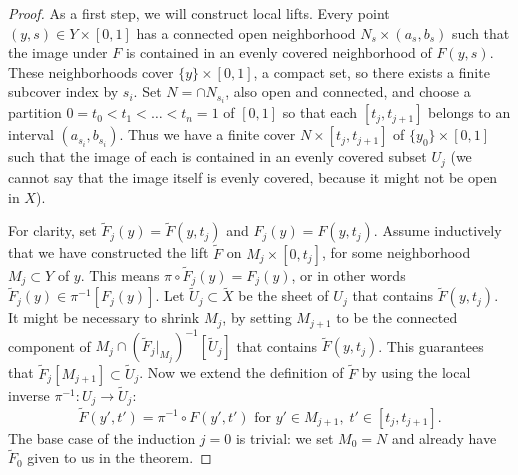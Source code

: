 \begin{proof}
As a first step, we will construct local lifts.
Every point $(y,s) \in Y \times [0,1]$ has a connected open neighborhood $N_s \times (a_s,b_s)$ such that the image under $F$ is contained in an evenly covered neighborhood of $F(y,s)$.
These neighborhoods cover $\{y\} \times [0,1]$, a compact set, so there exists a finite subcover index by $s_i$.
Set $N = \cap N_{s_i}$, also open and connected, and choose a partition $0 = t_0 < t_1 < \dots < t_n = 1$ of $[0,1]$ so that each $[t_j, t_{j+1}]$ belongs to an interval $(a_{s_i},b_{s_i})$.
Thus we have a finite cover $N \times [t_j, t_{j+1}]$ of $\{y_0\} \times [0,1]$ such that the image of each is contained in an evenly covered subset $U_j$ (we cannot say that the image itself is evenly covered, because it might not be open in $X$).
\begin{center}
\end{center}


For clarity, set $\tilde{F}_j(y) = \tilde{F}(y,t_j)$ and $F_j(y) = F(y,t_j)$.
Assume inductively that we have constructed the lift $\tilde{F}$ on $M_j \times [0,t_j]$, for some neighborhood $M_j \subset Y$ of $y$.
This means $\pi \circ \tilde{F}_j(y) = F_j(y)$, or in other words $\tilde{F}_j(y) \in \pi^{-1}[F_j(y)]$.
Let $\tilde{U}_j \subset \tilde{X}$ be the sheet of $U_j$ that contains $\tilde{F}(y,t_j)$.
It might be necessary to shrink $M_j$, by setting $M_{j+1}$ to be the connected component of $M_{j} \cap (\tilde{F}_j |_{M_{j}})^{-1}[\tilde{U}_j]$ that contains $\tilde{F}(y,t_j)$.
This guarantees that $\tilde{F}_j[M_{j+1}] \subset \tilde{U}_j$.
Now we extend the definition of $\tilde{F}$ by using the local inverse $\pi^{-1} : U_j \to \tilde{U}_j$:
\[
\tilde{F}(y', t') = \pi^{-1} \circ F(y',t') \text{ for } y' \in M_{j+1},\; t' \in [t_j,t_{j+1}].
\]
The base case of the induction $j=0$ is trivial: we set $M_0 = N$ and already have $\tilde{F}_0$ given to us in the theorem.


\end{proof}
